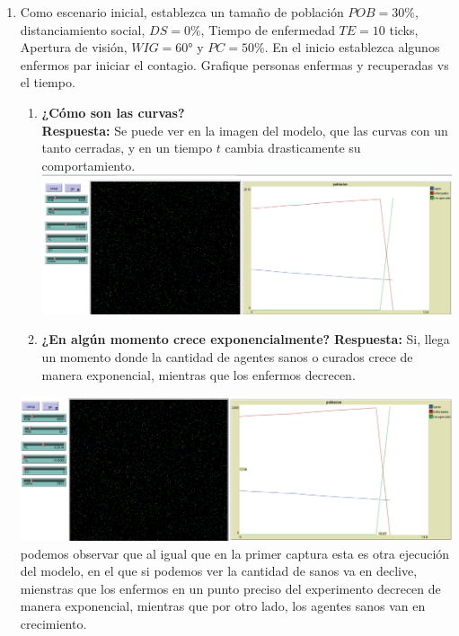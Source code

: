 \documentclass[12pt]{article}
\begin{document}
\begin{enumerate}
    \item Como escenario inicial, establezca un tamaño de población $POB=30\%$, distanciamiento social, $DS=0\%$, Tiempo de enfermedad $TE=10$ ticks, Apertura de visión, $WIG=60$° y $PC=50\%$. En el inicio establezca algunos enfermos par iniciar el contagio.
    Grafique personas enfermas y recuperadas vs  el tiempo.\\
    \begin{enumerate}
    \item \textbf{¿Cómo son las curvas?}\\
    \textbf{Respuesta:} Se puede ver en la imagen del modelo, que las curvas con un tanto cerradas, y en un tiempo $t$ cambia drasticamente su comportamiento.\\
    \textbf{\includegraphics[scale = 0.30]{images/p1.png}}
    \item \textbf{¿En algún momento crece exponencialmente?}
    \textbf{Respuesta:} Si, llega un momento donde la cantidad de agentes sanos o curados crece de manera exponencial, mientras que los enfermos decrecen.
    \end{enumerate}

    \textbf{\includegraphics[scale = 0.30]{images/p1-1.png}}\\
    podemos observar que al igual que en la primer captura esta es otra ejecución del modelo, en el que si podemos ver la cantidad de sanos va en declive,
    mienstras que los enfermos en un punto preciso del experimento decrecen de manera exponencial, mientras que por otro lado, los agentes sanos van en crecimiento.



\end{enumerate}
\end{document}
